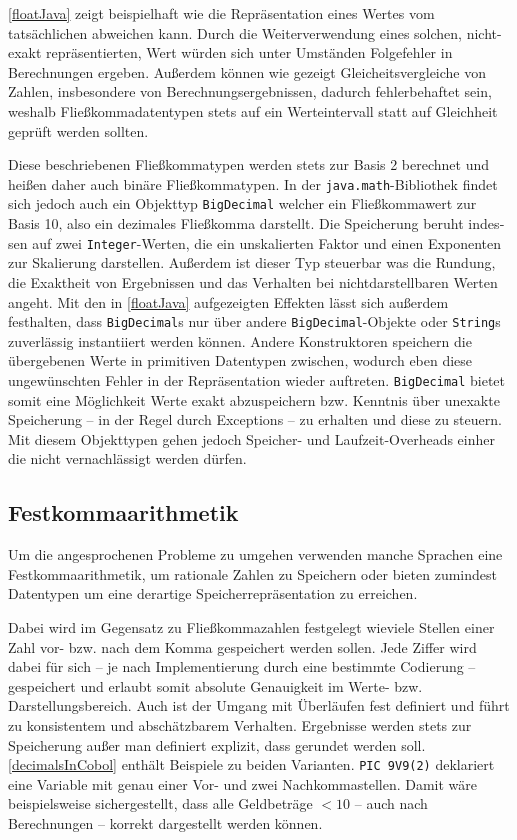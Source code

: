\autoref{floatJava} zeigt beispielhaft wie die Repräsentation eines Wertes vom tatsächlichen abweichen kann. Durch die Weiterverwendung eines solchen, nicht-exakt repräsentierten, Wert würden sich unter Umständen Folgefehler in Berechnungen ergeben. Außerdem können wie gezeigt Gleicheitsvergleiche von Zahlen, insbesondere von Berechnungsergebnissen, dadurch fehlerbehaftet sein, weshalb Fließkommadatentypen stets auf ein Werteintervall statt auf Gleichheit geprüft werden sollten.

Diese beschriebenen Fließkommatypen werden stets zur Basis 2 berechnet und heißen daher auch binäre Fließkommatypen. In der \texttt{java.math}-Bibliothek findet sich jedoch auch ein Objekttyp \texttt{BigDecimal} welcher ein Fließkommawert zur Basis 10, also ein dezimales Fließkomma darstellt. Die Speicherung beruht in­des­sen auf zwei \texttt{Integer}-Werten, die ein unskalierten Faktor und einen Exponenten zur Skalierung darstellen. Außerdem ist dieser Typ steuerbar was die Rundung, die Exaktheit von Ergebnissen und das Verhalten bei nichtdarstellbaren Werten angeht. Mit den in \autoref{floatJava} aufgezeigten Effekten lässt sich außerdem festhalten, dass \texttt{BigDecimal}s nur über andere \texttt{BigDecimal}-Objekte oder \texttt{String}s zuverlässig instantiiert werden können. Andere Konstruktoren speichern die übergebenen Werte in primitiven Datentypen zwischen, wodurch eben diese ungewünschten Fehler in der Repräsentation wieder auftreten. \texttt{BigDecimal} bietet somit eine Möglichkeit Werte exakt abzuspeichern bzw. Kenntnis über unexakte Speicherung -- in der Regel durch Exceptions -- zu erhalten und diese zu steuern. Mit diesem Objekttypen gehen jedoch Speicher- und Laufzeit-Overheads einher die nicht vernachlässigt werden dürfen.

\subsection*{Festkommaarithmetik}
Um die angesprochenen Probleme zu umgehen verwenden manche Sprachen eine Festkommaarithmetik, um rationale Zahlen zu Speichern oder bieten zumindest Datentypen um eine derartige Speicherrepräsentation zu erreichen. 

Dabei wird im Gegensatz zu Fließkommazahlen festgelegt wieviele Stellen einer Zahl vor- bzw. nach dem Komma gespeichert werden sollen. Jede Ziffer wird dabei für sich -- je nach Implementierung durch eine bestimmte Codierung -- gespeichert und erlaubt somit absolute Genauigkeit im Werte- bzw. Darstellungsbereich. Auch ist der Umgang mit Überläufen fest definiert und führt zu konsistentem und abschätzbarem Verhalten. Ergebnisse werden stets zur Speicherung  außer man definiert explizit, dass gerundet werden soll. \autoref{decimalsInCobol} enthält Beispiele zu beiden Varianten. \texttt{PIC 9V9(2)} deklariert eine Variable mit genau einer Vor- und zwei Nachkommastellen. Damit wäre beispielsweise sichergestellt, dass alle Geldbeträge $< 10$ -- auch nach Berechnungen -- korrekt dargestellt werden können.

